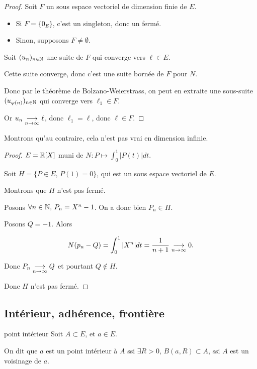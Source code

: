 \begin{proof}
    Soit $F$ un sous espace vectoriel de dimension finie de $E$. 

    \begin{itemize}
        \item Si $F = \{0_E\}$, c'est un singleton, donc un fermé.
        \item Sinon, supposons $F \neq \emptyset$. 
    \end{itemize}

    Soit $(u_n)_{n \in \mathbb{N}}$ une suite de $F$ qui converge vers $\ell \in E$.

    Cette suite converge, donc c'est une suite bornée de $F$ pour $N$. 

    Donc par le théorème de Bolzano-Weierstrass, on peut en extraite une sous-suite $(u_{\varphi(n)})_{n \in \mathbb{N}}$ qui converge vers
    $\ell_1 \in F$.

    Or $u_n \underset{n \to \infty}{\longrightarrow} \ell$, donc $\ell_1 = \ell$, donc $\ell \in F$.
\end{proof}

Montrons qu'au contraire, cela n'est pas vrai en dimension infinie.

\begin{proof}
    $E = \mathbb{R} [X]$ muni de $N: P \mapsto \int_{0}^1 |P(t)| dt$.

    Soit $H = \{P \in E, \, P(1) = 0\}$, qui est un sous espace vectoriel de $E$.

    Montrons que $H$ n'est pas fermé.

    Posons $\forall n \in \mathbb{N}, \, P_n = X^n - 1$. On a donc bien $P_n \in H$.

    Posons $Q = -1$. Alors 

    $$ N(p_n - Q ) = \int_0^1 |X^n| dt = \frac 1 {n+1} \underset{n \to \infty}{\longrightarrow} 0.$$

    Donc $P_n \underset{n \to \infty}{\longrightarrow} Q$ et pourtant $Q \not \in H$.

    Donc $H$ n'est pas fermé.
\end{proof}


\subsection{Intérieur, adhérence, frontière}

\begin{definition}{point intérieur}{}
    Soit $A \subset E$, et $a \in E$.

    On dit que $a$ est un point intérieur à $A$ ssi $\exists R > 0, \, B(a, R) \subset A$,
    ssi $A$ est un voisinage de $a$. 
\end{definition}



